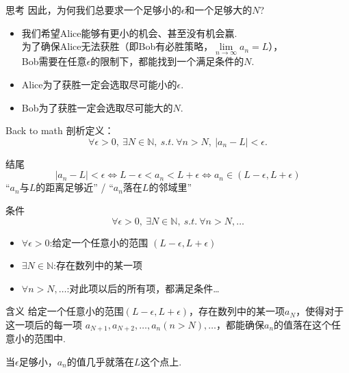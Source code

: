 \documentclass[]{beamer}
\begin{document}
\begin{frame}{思考}
    因此，为何我们总要求一个足够小的$\epsilon$和一个足够大的$N$?
    \begin{itemize}
        \item 我们希望Alice能够有更小的机会、甚至没有机会赢.\\
        为了确保Alice无法获胜（即Bob有必胜策略，$\lim\limits_{n\rightarrow\infty}a_n=L$），\\
        Bob需要在任意$\epsilon$的限制下，都能找到一个满足条件的$N$. \\
        \item Alice为了获胜一定会选取尽可能小的$\epsilon$.
        \item Bob为了获胜一定会选取尽可能大的$N$.
    \end{itemize}
\end{frame}

\begin{frame}{Back to math}
    剖析定义：
    \[
    \forall \epsilon >0,\ \exists N\in \mathbb{N},\ s.t.\ \forall n>N,\ |a_n-L|<\epsilon.
    \]
\end{frame}

\begin{frame}{结尾}
    \[
    |a_n-L|<\epsilon \Leftrightarrow L-\epsilon < a_n < L+\epsilon \Leftrightarrow a_n\in(L-\epsilon, L+\epsilon)
    \]
    \centering“$a_n$与$L$的距离足够近” / “$a_n$落在$L$的邻域里”
\end{frame}

\begin{frame}{条件}
    \[
    \forall \epsilon >0,\ \exists N\in \mathbb{N},\ s.t.\ \forall n>N, \dots
    \]
    \begin{itemize}
        \item $\forall \epsilon >0$:给定一个任意小的范围 $(L-\epsilon, L+\epsilon)$
        \item $\exists N\in \mathbb{N}$:存在数列中的某一项
        \item $\forall n>N, \dots$:对此项以后的所有项，都满足条件\dots
    \end{itemize}
\end{frame}

\begin{frame}{含义}
    给定一个任意小的范围$(L-\epsilon, L+\epsilon)$，存在数列中的某一项$a_N$，使得对于这一项后的每一项
    $a_{N+1},a_{N+2},\ldots,a_n(n>N),\ldots$，都能确保$a_n$的值落在这个任意小的范围中.

    当$\epsilon$足够小，$a_n$的值几乎就落在$L$这个点上.
\end{frame}
\end{document}
